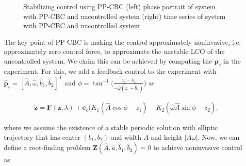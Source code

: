 \documentclass[openacc]{rsproca_new}%
\theoremstyle{own}
\def\vec#1{\ensuremath{\mathbf{#1}}}
\begin{document}
\begin{figure}
  \centering
  \hspace*{-0.3em}
  \caption{Stabilizing control using PP-CBC (left) phase portrait of system with PP-CBC and uncontrolled system (right) time series of system with PP-CBC and uncontrolled system}\label{pp_CBC}
\end{figure}

The key point of PP-CBC is making the control approximately noninvasive, i.e. approximately zero control force, to approximate the unstable LCO of the uncontrolled system. We claim this can be achieved by computing the $\vec p_c$ in the experiment. For this, we add a feedback control to the experiment with $\hat {\vec p}_c=[\hat A,\hat \omega,\hat b_1,\hat b_2]^\textrm{T}$ and $\phi=\tan^{-1}\Big(\frac{z_2-\hat b_2}{-\hat \omega(z_1-\hat b_1)}\Big)$ as

\begin{align}\label{CBC+2}
\dot{\vec{z}}= \vec F(\vec{z},\lambda)+\vec e_c (K_1(\hat A\cos \phi-z_1)- K_2(\hat \omega \hat A\sin \phi -z_2).
\end{align}

\noindent where we assume the existence of a stable periodic solution with elliptic trajectory that has center $(b_1,b_2)$ and width $A$ and height $|A\omega|$. Now, we can define a root-finding problem $\vec Z(\hat A,\hat a,\hat b_1,\hat b_2) = 0$ to achieve noninvasive control as
\end{document}
